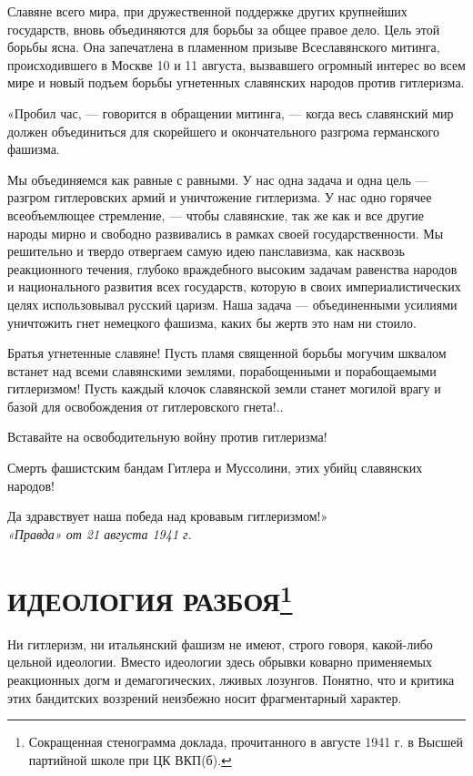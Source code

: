 \documentclass[12pt, a4paper, openany]{book}
\begin{document}
Славяне всего мира, при дружественной поддержке других крупнейших государств, вновь объединяются для борьбы за общее правое дело. Цель этой борьбы ясна. Она запечатлена в пламенном призыве Всеславянского митинга, происходившего в Москве 10 и 11 августа, вызвавшего огромный интерес во всем мире и новый подъем борьбы угнетенных славянских народов против гитлеризма.

«Пробил час, — говорится в обращении митинга, — когда весь славянский мир должен объединиться для скорейшего и окончательного разгрома германского фашизма.

Мы объединяемся как равные с равными. У нас одна задача и одна цель — разгром гитлеровских армий и уничтожение гитлеризма. У нас одно горячее всеобъемлющее стремление, — чтобы славянские, так же как и все другие народы мирно и свободно развивались в рамках своей государственности. Мы решительно и твердо отвергаем самую идею панславизма, как насквозь реакционного течения, глубоко враждебного высоким задачам равенства народов и национального развития всех государств, которую в своих империалистических целях использовывал русский царизм. Наша задача — объединенными усилиями уничтожить гнет немецкого фашизма, каких бы жертв это нам ни стоило.

Братья угнетенные славяне! Пусть пламя священной борьбы могучим шквалом встанет над всеми славянскими землями, порабощенными и порабощаемыми гитлеризмом! Пусть каждый клочок славянской земли станет могилой врагу и базой для освобождения от гитлеровского гнета!..

Вставайте на освободительную войну против гитлеризма!

Смерть фашистским бандам Гитлера и Муссолини, этих убийц славянских народов!

Да здравствует наша победа над кровавым гитлеризмом!»
\ \\

\noindent\textit{«Правда» от 21 августа 1941 г.}

\newpage

\section[Идеология разбоя]{\center \textbf{ИДЕОЛОГИЯ РАЗБОЯ{\footnote{Сокращенная стенограмма доклада, прочитанного в августе 1941 г. в Высшей партийной школе при ЦК ВКП(б).}}}}	


Ни гитлеризм, ни итальянский фашизм не имеют, строго говоря, какой-либо цельной идеологии. Вместо идеологии здесь обрывки коварно применяемых реакционных догм и демагогических, лживых лозунгов. Понятно, что и критика этих бандитских воззрений неизбежно носит фрагментарный характер.
\end{document}
